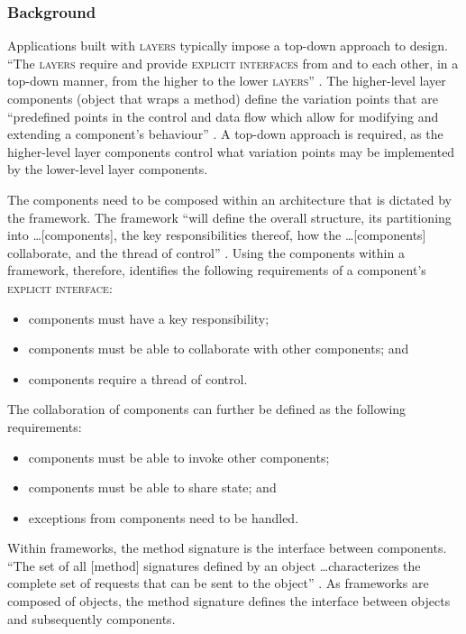 \documentclass[prodmode]{style/acmlarge}
\begin{document}
\subsubsection*{Background}

Applications built with \textsc{layers} typically impose a top-down approach to
design.  ``The \textsc{layers} require and provide \textsc{explicit interfaces}
from and to each other, in a top-down manner, from the higher to the lower
\textsc{layers}'' \cite[p. 11]{ioc}.  The higher-level layer components (object
that wraps a method) define the variation points that are ``predefined points in
the control and data flow which allow for modifying and extending a component's
behaviour'' \cite[p. 5]{ioc}.  A top-down approach is required, as the
higher-level layer components control what variation points may be implemented
by the lower-level layer components.

The components need to be composed within an architecture that is dictated by
the framework.  The framework ``will define the overall structure, its
partitioning into \ldots [components], the key responsibilities thereof, how the
\ldots [components] collaborate, and the thread of control'' \cite[p. 26]{gof}.
Using the components within a framework, therefore, identifies the following
requirements of a component's \textsc{explicit interface}:
\begin{itemize}
  \item components must have a key responsibility;
  \item components must be able to collaborate with other components; and
  \item components require a thread of control.
\end{itemize}

The collaboration of components can further be defined as the following
requirements:
\begin{itemize}
  \item components must be able to invoke other components;
  \item components must be able to share state; and
  \item exceptions from components need to be handled.
\end{itemize}

Within frameworks, the method signature is the interface between components.
``The set of all [method] signatures defined by an object \ldots characterizes
the complete set of requests that can be sent to the object'' \cite[p. 13]{gof}.
As frameworks are composed of objects, the method signature defines the
interface between objects and subsequently components.
\end{document}

